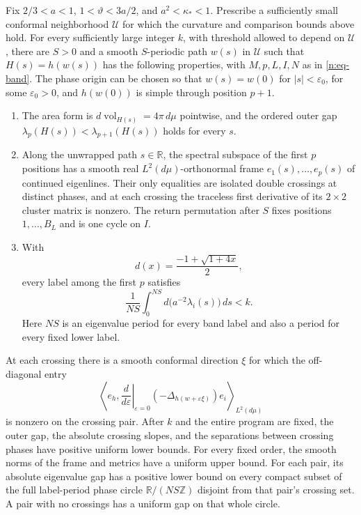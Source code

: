 \begin{proposition}\label{n:prop-angular-program}
Fix \(2/3<a<1\), \(1<\vartheta<3a/2\), and
\(a^2<\kappa_*<1\).  Prescribe a sufficiently small conformal
neighborhood \(\mathcal U\) for which the curvature and comparison
bounds above hold.  For every sufficiently large integer \(k\), with
threshold allowed to depend on \(\mathcal U\),
there are \(S>0\) and a smooth \(S\)-periodic path \(w(s)\) in
\(\mathcal U\) such that \(H(s)=h(w(s))\) has the following
properties, with \(M,p,L,I,N\) as in \eqref{n:eq-band}.
The phase origin can be chosen so that \(w(s)=w(0)\) for
\(|s|<\varepsilon_0\), for some \(\varepsilon_0>0\), and
\(h(w(0))\) is simple through position \(p+1\).
\begin{enumerate}
\item The area form is \(d\operatorname{vol}_{H(s)}=4\pi\,d\mu\)
      pointwise, and the ordered outer gap
      \(\lambda_p(H(s))<\lambda_{p+1}(H(s))\) holds for every \(s\).
\item Along the unwrapped path \(s\in\mathbb R\), the spectral subspace
      of the first \(p\) positions has a smooth real
      \(L^2(d\mu)\)-orthonormal frame
      \(e_1(s),\ldots,e_p(s)\) of continued eigenlines.  Their
      only equalities are isolated double crossings at distinct
      phases, and at each crossing the traceless first derivative
      of its \(2\times2\) cluster matrix is nonzero.  The return
      permutation after \(S\) fixes positions \(1,\ldots,B_L\)
      and is one cycle on \(I\).
\item With
      \[
       d(x)=\frac{-1+\sqrt{1+4x}}2,
      \]
      every label among the first \(p\) satisfies
      \begin{equation}\label{n:eq-frequency-margin}
       \frac1{NS}\int_0^{NS}d\bigl(a^{-2}\lambda_i(s)\bigr)\,ds<k.
      \end{equation}
      Here \(NS\) is an eigenvalue period for every band label and
      also a period for every fixed lower label.
\end{enumerate}
At each crossing there is a smooth conformal direction \(\xi\) for
which the off-diagonal entry
\[
 \left\langle e_h,
     \left.\frac{d}{d\varepsilon}\right|_{\varepsilon=0}
        (-\Delta_{h(w+\varepsilon\xi)})e_i
 \right\rangle_{L^2(d\mu)}
\]
is nonzero on the crossing pair.  After \(k\) and the entire program
are fixed, the outer gap, the absolute crossing slopes, and the
separations between crossing phases have positive uniform lower
bounds.  For every fixed order, the smooth norms of the frame and
metrics have a uniform upper bound.  For each pair, its absolute
eigenvalue gap has a positive lower bound on every compact subset of
the full label-period phase circle \(\mathbb R/(NS\mathbb Z)\)
disjoint from that pair's crossing set.  A pair with no crossings
has a uniform gap on that whole circle.
\end{proposition}

